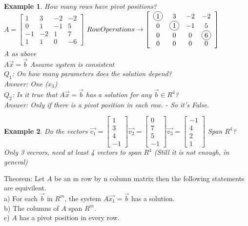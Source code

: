 \documentclass[a4paper,12pt]{book}
\newcommand*\circled[1]{\tikz[baseline=(char.base)]{
            \node[shape=circle,draw,inner sep=2pt] (char) {#1};}}
\theoremstyle{defn}
\theoremstyle{expl}
\newtheorem{expl}{Example}[section]
\begin{document}
\begin{expl}
\textup{
How many rows have pivot positions?\\
$A = \left[\begin{array}{cccc}1&3&-2&-2\\0&1&-1&5\\-1&-2&1&7\\1&1&0&-6\end{array}\right]$
$Row Operations \rightarrow \left[\begin{array}{cccc}\circled{1}&3&-2&-2\\0&\circled{1}&-1&5\\0&0&0&\circled{6}\\0&0&0&0\end{array}\right]$\\
A as above\\ $A\vec{x}=\vec{b}$ Assume system is consistent\\
$Q_1$: On how many parameters does the solution depend?\\
Answer: One ($x_3$)\\
$Q_2$: Is it true that $A\vec{x}=\vec{b}$ has a solution for any $\vec{b} \in R^4$?\\
Answer: Only if there is a pivot position in each row. - So it's False.
}\end{expl}
\begin{expl}
\textup{
Do the vectors $\vec{v_1}=\left[\begin{array}{c}1\\3\\4\\-1\end{array}\right] \vec{v_2}=\left[\begin{array}{c}0\\7\\5\\-1\end{array}\right] \vec{v_3}=\left[\begin{array}{c}-1\\4\\2\\1\end{array}\right]$ Span $R^4$?\\
Only 3 vecrors, need at least 4 vectors to span $R^4$ (Still it is not enough, in general)\\
}\end{expl}
Theorem: Let $A$ be an m row by n column matrix then the following statements are equivilent.\\
a) For each $\vec{b}$ in $R^m$, the system $A\vec{x_1}=\vec{b}$ has a solution.\\
b) The columns of $A$ span $R^m$.\\
c) $A$ has a pivot position in every row.
\end{document}
